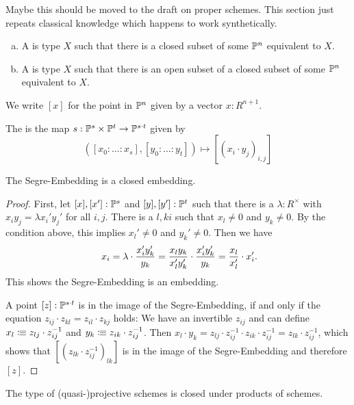 
Maybe this should be moved to the draft on proper schemes.
This section just repeats classical knowledge which happens to work synthetically.

\begin{definition}
  \begin{enumerate}[(a)]
  \item A  is type $X$ such that there is a closed subset of some $\mathbb{P}^n$ equivalent to $X$.
  \item A  is type $X$ such that there is an open subset of a closed subset of some $\mathbb{P}^n$ equivalent to $X$.
  \end{enumerate}
\end{definition}

We write $[x]$ for the point in $\mathbb{P}^n$ given by a vector $x:R^{n+1}$.

\begin{definition}
  The  is the map $s:\mathbb{P}^s\times \mathbb{P}^t\to \mathbb{P}^{s\cdot t}$ given by
  \[
    ([x_0:\dots : x_s],[y_0:\dots :y_t])\mapsto [(x_i\cdot y_j)_{i,j}]
  \]
\end{definition}

\begin{proposition}
  The Segre-Embedding is a closed embedding.
\end{proposition}

\begin{proof}
  First, let $[x],[x']:\mathbb{P}^{s}$ and $[y],[y']:\mathbb{P}^{t}$ such that there is a $\lambda:R^\times$ with $x_iy_j=\lambda x_i'y_j'$ for all $i,j$.
  There is a $l,ki$ such that $x_l\neq 0$ and $y_k\neq 0$.
  By the condition above, this implies $x_l'\neq 0$ and $y_k'\neq 0$.
  Then we have 
  \[
    x_i = \lambda \cdot \frac{x_i'y_k'}{y_k} = \frac{x_ly_k}{x_l'y_k'} \cdot \frac{x_i'y_k'}{y_k} = \frac{x_l}{x_l'} \cdot x_i'
     \rlap{.}
   \]
   This shows the Segre-Embedding is an embedding.

   A point $[z]:\mathbb{P}^{s\cdot t}$ is in the image of the Segre-Embedding, if and only if the equation $z_{ij}\cdot z_{kl}=z_{il}\cdot z_{kj}$ holds:
   We have an invertible $z_{ij}$ and can define $x_{l}\vcentcolon\mspace{-1.2mu}\equiv z_{lj}\cdot z_{ij}^{-1}$ and $y_{k}\vcentcolon\mspace{-1.2mu}\equiv z_{ik}\cdot z_{ij}^{-1}$.
   Then $x_l\cdot y_k= z_{lj}\cdot z_{ij}^{-1} \cdot z_{ik}\cdot z_{ij}^{-1}=z_{lk}\cdot z_{ij}^{-1}$,
   which shows that $[(z_{lk}\cdot z_{ij}^{-1})_{lk}]$ is in the image of the Segre-Embedding and therefore $[z]$.
 \end{proof}

 \begin{theorem}
   The type of (quasi-)projective schemes is closed under products of schemes.
 \end{theorem}